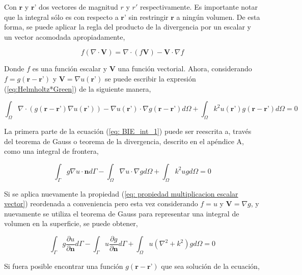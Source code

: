 \documentclass[12pt,letterpaper]{article}
\numberwithin{equation}{section}
\begin{document}
Con $\textbf{r}$ y $\textbf{r'}$ dos vectores de magnitud $r$ y $r'$ respectivamente. Es importante notar que la integral sólo es con respecto a $\textbf{r'}$ sin restringir $\textbf{r}$ a ningún volumen. De esta forma, se puede aplicar la regla del producto de la divergencia por un escalar y un vector acomodada apropiadamente,

\begin{equation}
	f(\nabla\cdot\textbf{V})=\nabla\cdot (f\textbf{V})-\textbf{V}\cdot\nabla f
\label{eq: propiedad multiplicacion escalar vector}
\end{equation}

Donde $f$ es una función escalar y $\textbf{V}$ una función vectorial. Ahora, considerando $f=g(\textbf{r}-\textbf{r'})$ y $\textbf{V}=\nabla u(\textbf{r'})$ se puede escribir la expresión (\ref{eq:Helmholtz*Green}) de la siguiente manera, 

\begin{equation}
\int_{\Omega}\nabla\cdot (g(\textbf{r}-\textbf{r'})\nabla u(\textbf{r'}))-\nabla u(\textbf{r'})\cdot\nabla g(\textbf{r}-\textbf{r'}) d\varOmega+\int_{\Omega}k^2u(\textbf{r'})g(\textbf{r}-\textbf{r'})d\varOmega=0
\label{eq: BIE_int_1}
\end{equation}

La primera parte de la ecuación (\ref{eq: BIE_int_1}) puede ser reescrita a, través del teorema de Gauss o teorema de la divergencia, descrito en el apéndice A, como una integral de frontera,

\begin{equation}
\int_{\Gamma}g\nabla u\cdot\textbf{n}d\varGamma-\int_{\Omega}\nabla u\cdot\nabla g d\varOmega+\int_{\Omega}k^2ugd\varOmega=0
\label{eq: BIE_int_2}
\end{equation}

\pagebreak
Si se aplica nuevamente la propiedad (\ref{eq: propiedad multiplicacion escalar vector}) reordenada a conveniencia pero esta vez considerando $f=u$ y $\textbf{V}=\nabla g$, y nuevamente se utiliza el teorema de Gauss para representar una integral de volumen en la superficie, se puede obtener,

\begin{equation}
\int_{\Gamma}g\frac{\partial u}{\partial\textbf{n}}d\varGamma-\int_{\Gamma}u\frac{\partial g}{\partial\textbf{n}}d\varGamma+\int_{\Omega}u(\nabla^2+k^2)gd\varOmega=0
\label{eq: BIE_int_3}
\end{equation}

Si fuera posible encontrar una función $g(\textbf{r}-\textbf{r'})$ que sea solución de la ecuación,
\end{document}
